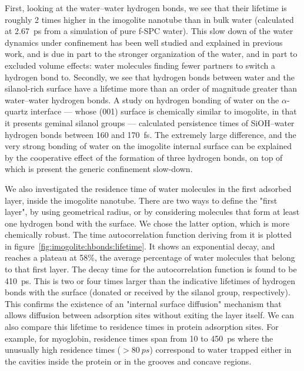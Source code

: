 \documentclass[thesis]{subfiles}
\begin{document}
First, looking at the water--water hydrogen bonds, we see that their lifetime is
roughly 2 times higher in the imogolite nanotube than in bulk water (calculated
at \SI{2.67}{ps} from a simulation of pure f-SPC water). This slow down of the
water dynamics under confinement has been well studied and explained in previous
work, and is due in part to the stronger organization of the water, and in part
to excluded volume effects: water molecules finding fewer partners to switch a
hydrogen bond to\cite{Fogarty2014, Fogarty2014-2}. Secondly, we see that
hydrogen bonds between water and the silanol-rich surface have a lifetime more
than an order of magnitude greater than water--water hydrogen bonds. A study on
hydrogen bonding of water on the $\alpha$-quartz interface --- whose (001)
surface is chemically similar to imogolite, in that it presents geminal silanol
groups --- calculated persistence times of SiOH--water hydrogen bonds between
160 and \SI{170}{fs}\cite{Ozkanlar2013}. The extremely large difference, and the
very strong bonding of water on the imogolite internal surface can be explained
by the cooperative effect of the formation of three hydrogen bonds, on top of
which is present the generic confinement slow-down.

We also investigated the residence time of water molecules in the first adsorbed
layer, inside the imogolite nanotube. There are two ways to define the "first
layer", by using geometrical radius, or by considering molecules that form at
least one hydrogen bond with the surface. We chose the latter option, which is
more chemically robust. The time autocorrelation function deriving from it is
plotted in figure~\ref{fig:imogolite:hbonds:lifetime}. It shows an exponential
decay, and reaches a plateau at 58\%, \ie the average percentage of water
molecules that belong to that first layer. The decay time for the
autocorrelation function is found to be \SI{410}{ps}. This is two or four times
larger than the indicative lifetimes of hydrogen bonds with the surface (donated
or received by the silanol group, respectively). This confirms the existence of
an "internal surface diffusion" mechanism that allows diffusion between adsorption
sites without exiting the layer itself. We can also compare this lifetime to
residence times in protein adsorption sites. For example, for
myoglobin\cite{Makarov2000}, residence times span from 10 to \SI{450}{ps} where
the unusually high residence times ($> \SI{80}{ps}$) correspond to water trapped
either in the cavities inside the protein or in the grooves and concave regions.
\end{document}
